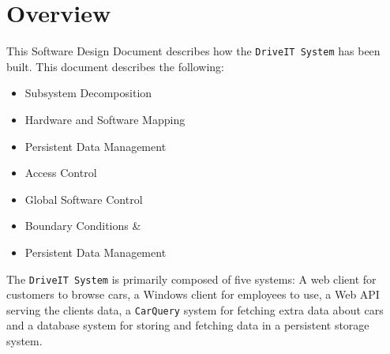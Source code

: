 \section{Overview}
This Software Design Document describes how the \texttt{DriveIT System} has been built.
This document describes the following:
\begin{itemize}
	\item Subsystem Decomposition
	\item Hardware and Software Mapping
	\item Persistent Data Management
	\item Access Control
	\item Global Software Control
	\item Boundary Conditions \&
	\item Persistent Data Management
\end{itemize}
The \texttt{DriveIT System} is primarily composed of five systems: 
A web client for customers to browse cars, a Windows client for employees to use, a Web API serving the clients data, a \texttt{CarQuery} system for fetching extra data about cars and a database system for storing and fetching data in a persistent storage system.